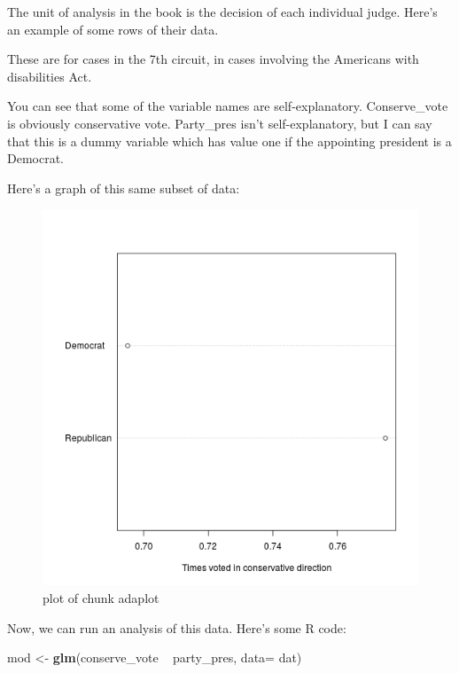 \documentclass[12pt,twoside]{article}
\newenvironment{Shaded}{}{}
\newcommand{\KeywordTok}[1]{\textcolor[rgb]{0.00,0.44,0.13}{\textbf{{#1}}}}
\newcommand{\DataTypeTok}[1]{\textcolor[rgb]{0.56,0.13,0.00}{{#1}}}
\newcommand{\StringTok}[1]{\textcolor[rgb]{0.25,0.44,0.63}{{#1}}}
\newcommand{\NormalTok}[1]{{#1}}
\begin{document}
The unit of analysis in the book is the decision of each individual
judge. Here's an example of some rows of their data.

These are for cases in the 7th circuit, in cases involving the Americans
with disabilities Act.

You can see that some of the variable names are self-explanatory.
Conserve\_vote is obviously conservative vote. Party\_pres isn't
self-explanatory, but I can say that this is a dummy variable which has
value one if the appointing president is a Democrat.

Here's a graph of this same subset of data:

\begin{figure}[htbp]
\centering
\includegraphics{figure/adaplot-1.png}
\caption{plot of chunk adaplot}
\end{figure}

Now, we can run an analysis of this data. Here's some R code:

\begin{Shaded}
\begin{Highlighting}[]
\NormalTok{mod <-}\StringTok{ }\KeywordTok{glm}\NormalTok{(conserve_vote ~}\StringTok{  }\NormalTok{party_pres, }\DataTypeTok{data=} \NormalTok{dat)}
\end{Highlighting}
\end{Shaded}
\end{document}
